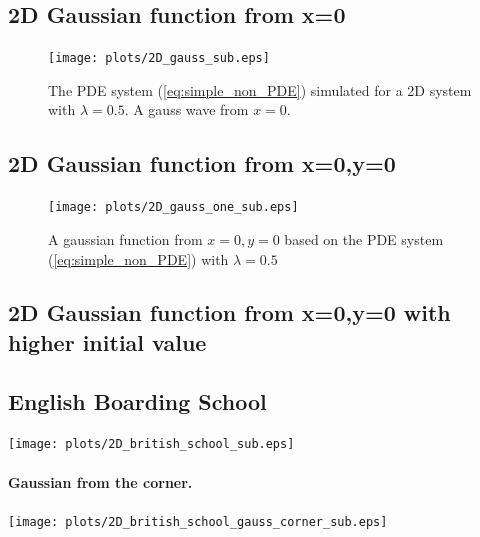 \documentclass[%
twoside,                 %
final,                   %
10pt]{article}
\begin{document}
\subsection{2D Gaussian function from x=0}


\begin{figure}[ht]
  \centerline{\texttt{[image: plots/2D\_gauss\_sub.eps]}}
  \caption{
  The PDE system (\ref{eq:simple_non_PDE}) simulated for a 2D system with $\lambda=0.5$. A gauss wave from $x=0$.
  }
\end{figure}


\subsection{2D Gaussian function from x=0,y=0}


\begin{figure}[ht]
  \centerline{\texttt{[image: plots/2D\_gauss\_one\_sub.eps]}}
  \caption{
  A gaussian function from $x=0,y=0$ based on the PDE system (\ref{eq:simple_non_PDE}) with $\lambda=0.5$
  }
\end{figure}


\subsection{2D Gaussian function from x=0,y=0 with higher initial value}

\subsection{English Boarding School}


\begin{center}  %
  \centerline{\texttt{[image: plots/2D\_british\_school\_sub.eps]}}
\end{center}


\paragraph{Gaussian from the corner.}
\begin{center}  %
  \centerline{\texttt{[image: plots/2D\_british\_school\_gauss\_corner\_sub.eps]}}
\end{center}
\end{document}
